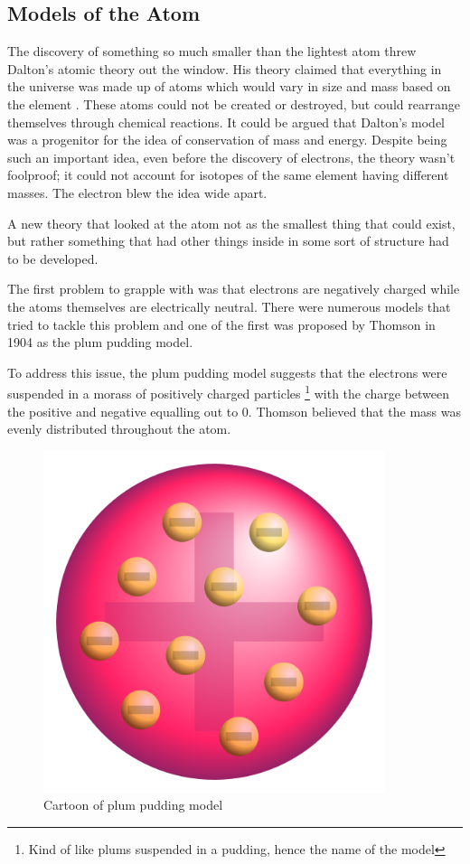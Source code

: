 \subsection{Models of the Atom}

The discovery of something so much smaller than the lightest atom threw Dalton's atomic theory out the window.
His theory claimed that everything in the universe was made up of atoms which would vary in size and mass based on the element .
These atoms could not be created or destroyed, but could rearrange themselves through chemical reactions.
It could be argued that Dalton's model was a progenitor for the idea of conservation of mass and energy\cite{Dalton}.
Despite being such an important idea, even before the discovery of electrons, the theory wasn't foolproof; it could not account for isotopes of the same element having different masses. 
The electron blew the idea wide apart.

A new theory that looked at the atom not as the smallest thing that could exist, but rather something that had other things inside in some sort of structure had to be developed.

The first problem to grapple with was that electrons are negatively charged while the atoms themselves are electrically neutral.
There were numerous models that tried to tackle this problem and one of the first was proposed by Thomson in 1904 as the plum pudding model.

To address this issue, the plum pudding model suggests that the electrons were suspended in a morass of positively charged particles
\footnote{Kind of like plums suspended in a pudding, hence the name of the model}
with the charge between the positive and negative equalling out to 0.
Thomson believed that the mass was evenly distributed throughout the atom\cite{Thomson_1907}.

\begin{figure}[H]
  \centering
  \includegraphics[width=100mm]{figures/plumPudding.png}
  \caption{Cartoon of plum pudding model\cite{PPmodel}}
  \label{plumPudding}
\end{figure}

